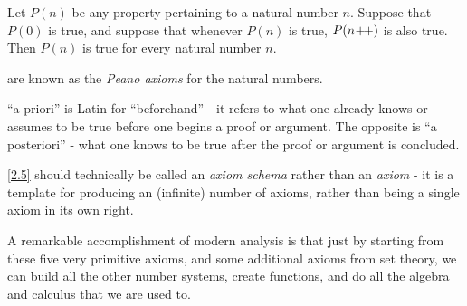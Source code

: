 \begin{ax}\label{2.5}
  Let \(P(n)\) be any property pertaining to a natural number \(n\).
  Suppose that \(P(0)\) is true, and suppose that whenever \(P(n)\) is true, \(P(n\!+\!\!+)\) is also true.
  Then \(P(n)\) is true for every natural number \(n\).
\end{ax}

\begin{note}
   are known as the \emph{Peano axioms} for the natural numbers.
\end{note}

\begin{note}
  ``a priori'' is Latin for ``beforehand''
  - it refers to what one already knows or assumes to be true before one begins a proof or argument.
  The opposite is ``a posteriori''
  - what one knows to be true after the proof or argument is concluded.
\end{note}

\begin{note}
  \cref{2.5} should technically be called an \emph{axiom schema} rather than an \emph{axiom}
  - it is a template for producing an (infinite) number of axioms, rather than being a single axiom in its own right.
\end{note}

\begin{note}
  A remarkable accomplishment of modern analysis is that just by starting from these five very primitive axioms, and some additional axioms from set theory, we can build all the other number systems, create functions, and do all the algebra and calculus that we are used to.
\end{note}
